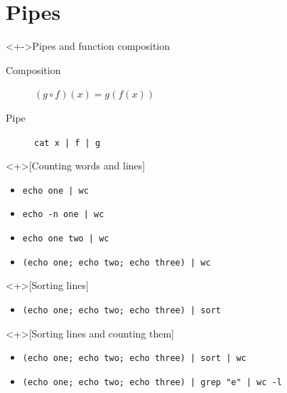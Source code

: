 \section{Pipes}

\begin{frame}[fragile]
  \begin{block}<+->{Pipes and function composition}
    \begin{description}
      \item[Composition] \(
          (g \circ f)(x) = g(f(x))
        \)
      \item[Pipe] \lstinline{cat x | f | g}
    \end{description}
  \end{block}

  \begin{example}<+>[Counting words and lines]
    \begin{itemize}
      \item \lstinline{echo one | wc}
      \item \lstinline{echo -n one | wc}
      \item \lstinline{echo one two | wc}
      \item \lstinline{(echo one; echo two; echo three) | wc}
    \end{itemize}
  \end{example}
\end{frame}

\begin{frame}[fragile]
  \begin{example}<+>[Sorting lines]
    \begin{itemize}
      \item \lstinline{(echo one; echo two; echo three) | sort}
    \end{itemize}
  \end{example}

  \begin{example}<+>[Sorting lines and counting them]
    \begin{itemize}
      \item \lstinline{(echo one; echo two; echo three) | sort | wc}
    \end{itemize}
  \end{example}
\end{frame}

\begin{frame}[fragile]
  \begin{example}
    \begin{itemize}
      \item \lstinline{(echo one; echo two; echo three) | grep "e" | wc -l}
    \end{itemize}
  \end{example}
\end{frame}


